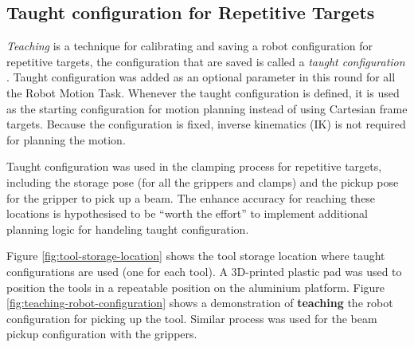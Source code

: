 \subsection{Taught configuration for Repetitive Targets}
\label{subsection:exploration-3-taught-configuration-for-repetitive-targets}

\textit{Teaching} is a technique for calibrating and saving a robot configuration for repetitive targets, the configuration that are saved is called a \textit{taught configuration} .
Taught configuration was added as an optional parameter in this round for all the Robot Motion Task. Whenever the taught configuration is defined, it is used as the starting configuration for motion planning instead of using Cartesian frame targets. Because the configuration is fixed, inverse kinematics (IK) is not required for planning the motion.

Taught configuration was used in the clamping process for repetitive targets, including the storage pose (for all the grippers and clamps) and the pickup pose for the gripper to pick up a beam. The enhance accuracy for reaching these locations is hypothesised to be ``worth the effort'' to implement additional planning logic for handeling taught configuration.

Figure \ref{fig:tool-storage-location} shows the tool storage location where taught configurations are used (one for each tool). A 3D-printed plastic pad was used to position the tools in a repeatable position on the aluminium platform. Figure \ref{fig:teaching-robot-configuration} shows a demonstration of \textbf{teaching} the robot configuration for picking up the tool. Similar process was used for the beam pickup configuration with the grippers.

